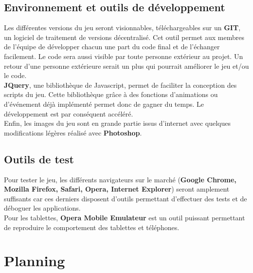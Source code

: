 \documentclass{article}
\begin{document}
\subsection{Environnement et outils de d\'eveloppement}

\hspace*{0.6cm}Les diff\'erentes versions du jeu seront visionnables, t\'el\'echargeables sur un \textbf{GIT}, un logiciel de traitement de versions d\'ecentralis\'e. Cet outil permet aux membres de l'\'equipe de d\'evelopper chacun une part du code final et de l'\'echanger facilement. Le code sera aussi visible par toute personne ext\'erieur au projet. Un retour d'une personne ext\'erieure serait un plus qui pourrait am\'eliorer le jeu et/ou le code.
\vspace{0.5cm}\\
\hspace*{0.6cm}\textbf{JQuery}, une biblioth\`eque de Javascript, permet de faciliter la conception des scripts du jeu. Cette biblioth\`eque gr\^ace \`a des fonctions d'animations ou d'\'ev\'enement d\'ej\`a impl\'ement\'e permet donc de gagner du temps. Le d\'eveloppement est par cons\'equent acc\'el\'er\'e.
\vspace{0.5cm}\\
\hspace*{0.6cm}Enfin, les images du jeu sont en grande partie issus d'internet avec quelques modifications l\'eg\`eres r\'ealis\'e avec \textbf{Photoshop}. 

\subsection{Outils de test}
\hspace*{0.6cm}Pour tester le jeu, les diff\'erents navigateurs sur le march\'e (\textbf{Google Chrome, Mozilla Firefox, Safari, Opera, Internet Explorer}) seront amplement suffisants car ces derniers disposent d'outils permettant d'effectuer des tests et de d\'eboguer les applications.\\
\hspace*{0.6cm}Pour les tablettes, \textbf{Opera Mobile Emulateur} est un outil puissant permettant de reproduire le comportement des tablettes et t\'el\'ephones.\\

\section{Planning}
\end{document}
